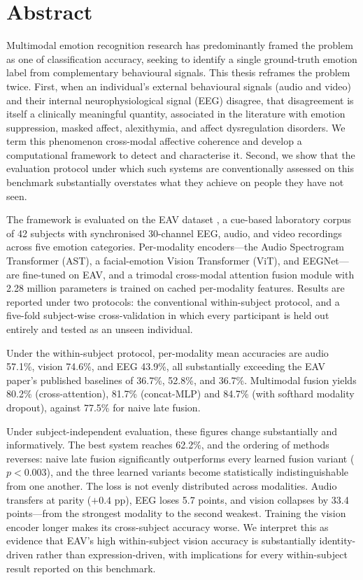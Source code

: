 \section*{Abstract}
Multimodal emotion recognition research has predominantly framed the problem as one of classification accuracy, seeking to identify a single ground-truth emotion label from complementary behavioural signals. This thesis reframes the problem twice. First, when an individual's external behavioural signals (audio and video) and their internal neurophysiological signal (EEG) disagree, that disagreement is itself a clinically meaningful quantity, associated in the literature with emotion suppression, masked affect, alexithymia, and affect dysregulation disorders. We term this phenomenon cross-modal affective coherence and develop a computational framework to detect and characterise it. Second, we show that the evaluation protocol under which such systems are conventionally assessed on this benchmark substantially overstates what they achieve on people they have not seen.

The framework is evaluated on the EAV dataset \cite{Lee2024EAV}, a cue-based laboratory corpus of 42 subjects with synchronised 30-channel EEG, audio, and video recordings across five emotion categories. Per-modality encoders---the Audio Spectrogram Transformer (AST), a facial-emotion Vision Transformer (ViT), and EEGNet---are fine-tuned on EAV, and a trimodal cross-modal attention fusion module with 2.28 million parameters is trained on cached per-modality features. Results are reported under two protocols: the conventional within-subject protocol, and a five-fold subject-wise cross-validation in which every participant is held out entirely and tested as an unseen individual.

Under the within-subject protocol, per-modality mean accuracies are audio 57.1\%, vision 74.6\%, and EEG 43.9\%, all substantially exceeding the EAV paper's published baselines of 36.7\%, 52.8\%, and 36.7\%. Multimodal fusion yields 80.2\% (cross-attention), 81.7\% (concat-MLP) and 84.7\% (with softhard modality dropout), against 77.5\% for naive late fusion.

Under subject-independent evaluation, these figures change substantially and informatively. The best system reaches 62.2\%, and the ordering of methods reverses: naive late fusion significantly outperforms every learned fusion variant ($p < 0.003$), and the three learned variants become statistically indistinguishable from one another. The loss is not evenly distributed across modalities. Audio transfers at parity ($+0.4$ pp), EEG loses 5.7 points, and vision collapses by 33.4 points---from the strongest modality to the second weakest. Training the vision encoder longer makes its cross-subject accuracy worse. We interpret this as evidence that EAV's high within-subject vision accuracy is substantially identity-driven rather than expression-driven, with implications for every within-subject result reported on this benchmark.

